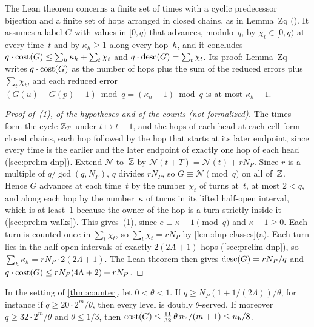 \begin{outline}
The Lean theorem  concerns a finite set of times with a cyclic predecessor bijection and a finite set
of hops arranged in closed chains, as in Lemma~Zq (). It assumes a label $G$ with values in
$[0,q)$ that advances, modulo~$q$, by $\chi_t\in[0,q)$ at every time~$t$ and by $\kappa_h\ge1$ along every hop~$h$, and it
concludes $q\cdot\mathrm{cost}(G)\le\sum_h\kappa_h+\sum_t\chi_t$ and $q\cdot\mathrm{desc}(G)=\sum_t\chi_t$. Its proof: Lemma~Zq writes
$q\cdot\mathrm{cost}(G)$ as the number of hops plus the sum of the reduced errors plus $\sum_t\chi_t$, and each reduced error
$(G(u)-G(p)-1)\bmod q=(\kappa_h-1)\bmod q$ is at most $\kappa_h-1$.
\end{outline}

\begin{proof}[Proof of~(1), of the hypotheses and of the counts (not formalized)]
The times form the cycle $\mathbb{Z}_T$ under $t\mapsto t-1$, and the hops of each head at each cell form closed chains, each hop
followed by the hop that starts at its later endpoint, since every time is the earlier and the later endpoint of exactly one
hop of each head (\cref{sec:prelim-dnp}). Extend $\mathcal N$ to~$\mathbb{Z}$ by $\mathcal N(t+T)=\mathcal N(t)+rN_P$. Since $r$ is a multiple of $q/\gcd(q,N_P)$, $q$
divides $rN_P$, so $G\equiv\mathcal N\pmod q$ on all of~$\mathbb{Z}$. Hence $G$ advances at each time~$t$ by the number $\chi_t$
of turns at~$t$, at most $2<q$, and along each hop by the number~$\kappa$ of turns in its lifted half-open interval, which
is at least~$1$ because the owner of the hop is a turn strictly inside it (\cref{sec:prelim-walks}). This gives~(1), since
$e\equiv\kappa-1\pmod q$ and $\kappa-1\ge0$. Each turn is counted once in $\sum_t\chi_t$, so $\sum_t\chi_t=rN_P$ by
\cref{lem:dnp-classes}(a). Each turn lies in the half-open intervals of exactly $2(2\Lambda+1)$ hops (\cref{sec:prelim-dnp}),
so $\sum_h\kappa_h=rN_P\cdot2(2\Lambda+1)$. The Lean theorem then gives $\mathrm{desc}(G)=rN_P/q$ and
$q\cdot\mathrm{cost}(G)\le rN_P(4\Lambda+2)+rN_P$.
\end{proof}

\begin{corollary}\label{cor:counter-served}
\notformalized
In the setting of \cref{thm:counter}, let $0<\theta<1$. If $q\ge N_P(1+1/(2\Lambda))/\theta$, for instance if
$q\ge20\cdot2^m/\theta$, then every level is doubly $\theta$-served. If moreover $q\ge32\cdot2^m/\theta$ and
$\theta\le1/3$, then $\mathrm{cost}(G)\le\frac{11}{32}\,\theta\,n_{\mathrm h}/(m+1)\le n_{\mathrm h}/8$.
\end{corollary}

